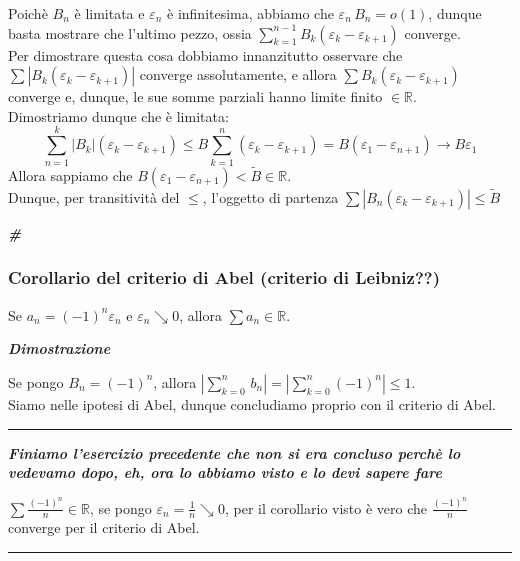 \documentclass{article}
\theoremstyle{definition}
\newcommand{\R}{\mathbb{R}}
\newcommand{\cvd}{\begin{center} \textbf{\textit{\#}} \end{center}}
\begin{document}
Poichè $B_n$ è limitata e $\varepsilon_n$ è infinitesima, abbiamo che $\varepsilon_n \, B_n = o(1)$, dunque basta mostrare che l'ultimo pezzo, ossia $\sum_{k=1}^{n-1}B_k(\varepsilon_k - \varepsilon_{k+1})$ converge.
\\
Per dimostrare questa cosa dobbiamo innanzitutto osservare che $\sum |B_k(\varepsilon_k - \varepsilon_{k+1})|$ converge assolutamente, e allora $\sum B_k(\varepsilon_k - \varepsilon_{k+1})$ converge e, dunque, le sue somme parziali hanno limite finito $\in \R$.
\\
Dimostriamo dunque che è limitata:
\begin{equation*}
    \sum_{n=1}^k |B_k|(\varepsilon_k-\varepsilon_{k+1}) \leqslant B \sum_{k=1}^n (\varepsilon_k - \varepsilon_{k+1})=B(\varepsilon_1 - \varepsilon_{n+1}) \to B\varepsilon_1
\end{equation*}
Allora sappiamo che $B(\varepsilon_1 - \varepsilon_{n+1}) < \tilde{B} \in \R$.
\\
Dunque, per transitività del $\leqslant$, l'oggetto di partenza $\sum |B_n (\varepsilon_k - \varepsilon_{k+1})| \leqslant \tilde{B}$
\\
\cvd
\subsubsection{Corollario del criterio di Abel (criterio di Leibniz??)}
Se $a_n=(-1)^n \varepsilon_n$ e $\varepsilon_n \searrow 0$, allora $\sum a_n \in \R$.
\begin{center}
    \textbf{\textit{Dimostrazione}}
\end{center}
Se pongo $B_n=(-1)^n$, allora $|\sum_{k=0}^n \, b_n |=|\sum_{k=0}^n (-1)^n | \leqslant 1$.
\\
Siamo nelle ipotesi di Abel, dunque concludiamo proprio con il criterio di Abel.
\vspace{15pt}
\hrule
\vspace{15pt}
\begin{center}
    \textbf{\textit{Finiamo l'esercizio precedente che non si era concluso perchè lo vedevamo dopo, eh, ora lo abbiamo visto e lo devi sapere fare}}
\end{center}
$\sum \frac{(-1)^n}{n} \in \R$, se pongo $\varepsilon_n= \frac{1}{n} \searrow 0$, per il corollario visto è vero che $\frac{(-1)^n}{n}$ converge per il criterio di Abel.
\vspace{15pt}
\hrule
\vspace{15pt}
\end{document}
